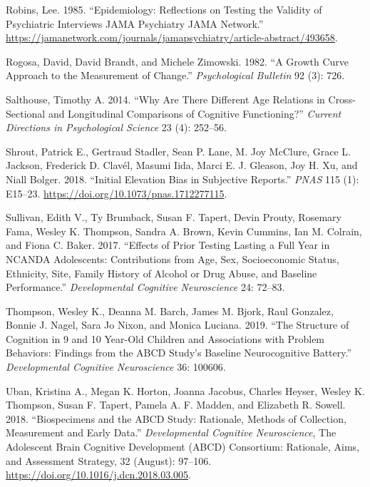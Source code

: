 \documentclass[
  letterpaper,
  DIV=11,
  numbers=noendperiod]{scrartcl}
\newlength{\cslhangindent}
\newlength{\cslentryspacingunit} %
\newenvironment{CSLReferences}[2] %
 {%
  \setlength{\parindent}{0pt}
  \ifodd #1
  \let\oldpar\par
  \def\par{\hangindent=\cslhangindent\oldpar}
  \fi
  \setlength{\parskip}{#2\cslentryspacingunit}
 }%
 {}
\begin{document}
\begin{CSLReferences}{1}{0}
\leavevmode{}%
Robins, Lee. 1985. {``Epidemiology: {Reflections} on {Testing} the
{Validity} of {Psychiatric} {Interviews} {\textbar} {JAMA} {Psychiatry}
{\textbar} {JAMA} {Network}.''}
\url{https://jamanetwork.com/journals/jamapsychiatry/article-abstract/493658}.

\leavevmode{}%
Rogosa, David, David Brandt, and Michele Zimowski. 1982. {``A Growth
Curve Approach to the Measurement of Change.''} \emph{Psychological
Bulletin} 92 (3): 726.

\leavevmode{}%
Salthouse, Timothy A. 2014. {``Why Are There Different Age Relations in
Cross-Sectional and Longitudinal Comparisons of Cognitive
Functioning?''} \emph{Current Directions in Psychological Science} 23
(4): 252--56.

\leavevmode{}%
Shrout, Patrick E., Gertraud Stadler, Sean P. Lane, M. Joy McClure,
Grace L. Jackson, Frederick D. Clavél, Masumi Iida, Marci E. J. Gleason,
Joy H. Xu, and Niall Bolger. 2018. {``Initial Elevation Bias in
Subjective Reports.''} \emph{PNAS} 115 (1): E15--23.
\url{https://doi.org/10.1073/pnas.1712277115}.

\leavevmode{}%
Sullivan, Edith V., Ty Brumback, Susan F. Tapert, Devin Prouty, Rosemary
Fama, Wesley K. Thompson, Sandra A. Brown, Kevin Cummins, Ian M.
Colrain, and Fiona C. Baker. 2017. {``Effects of Prior Testing Lasting a
Full Year in {NCANDA} Adolescents: Contributions from Age, Sex,
Socioeconomic Status, Ethnicity, Site, Family History of Alcohol or Drug
Abuse, and Baseline Performance.''} \emph{Developmental Cognitive
Neuroscience} 24: 72--83.

\leavevmode{}%
Thompson, Wesley K., Deanna M. Barch, James M. Bjork, Raul Gonzalez,
Bonnie J. Nagel, Sara Jo Nixon, and Monica Luciana. 2019. {``The
Structure of Cognition in 9 and 10 Year-Old Children and Associations
with Problem Behaviors: {Findings} from the {ABCD} Study's Baseline
Neurocognitive Battery.''} \emph{Developmental Cognitive Neuroscience}
36: 100606.

\leavevmode{}%
Uban, Kristina A., Megan K. Horton, Joanna Jacobus, Charles Heyser,
Wesley K. Thompson, Susan F. Tapert, Pamela A. F. Madden, and Elizabeth
R. Sowell. 2018. {``Biospecimens and the {ABCD} Study: {Rationale},
Methods of Collection, Measurement and Early Data.''}
\emph{Developmental Cognitive Neuroscience}, The {Adolescent} {Brain}
{Cognitive} {Development} ({ABCD}) {Consortium}: {Rationale}, {Aims},
and {Assessment} {Strategy}, 32 (August): 97--106.
\url{https://doi.org/10.1016/j.dcn.2018.03.005}.


\end{CSLReferences}
\end{document}
